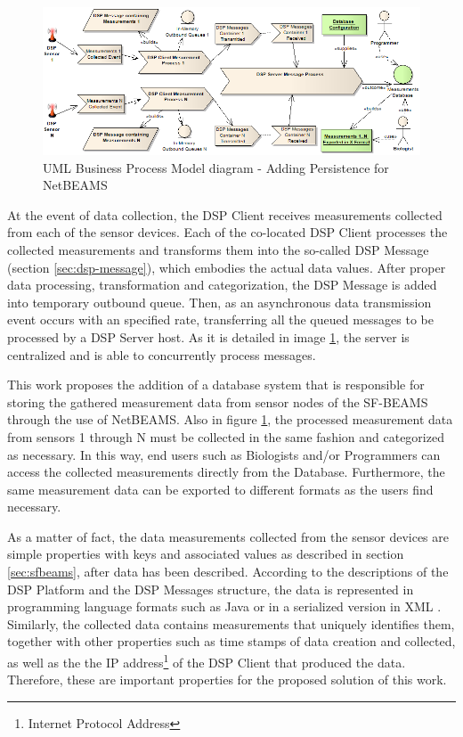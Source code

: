 \begin{figure}[!b]
  \centering
  \includegraphics[scale=0.5]{../diagrams/DSP-DataPersistence-Business-Diagram}
  \caption{UML Business Process Model diagram - Adding Persistence for NetBEAMS}
  \label{fig:dsp-persistence-business-process}
\end{figure}

At the event of data collection, the DSP Client receives measurements collected
from each of the sensor devices. Each of the co-located DSP Client processes
the collected measurements and transforms them into the so-called DSP Message
(section \ref{sec:dsp-message}), which embodies the actual data values. After
proper data processing, transformation and categorization, the DSP Message is
added into temporary outbound queue. Then, as an asynchronous data
transmission event occurs with an specified rate, transferring all the queued
messages to be processed by a DSP Server host. As it is detailed in image
\ref{fig:dsp-persistence-business-process}, the server is centralized and is
able to concurrently process messages.

This work proposes the addition of a database system that is responsible for
storing the gathered measurement data from sensor nodes of the SF-BEAMS through
the use of NetBEAMS. Also in figure \ref{fig:dsp-persistence-business-process}, 
the processed measurement data from sensors 1 through N must be collected in
the same fashion and categorized as necessary. In this way, end users such as
Biologists and/or Programmers can access the collected measurements directly
from the Database. Furthermore, the same measurement data can be exported to
different formats as the users find necessary.

As a matter of fact, the data measurements collected from the sensor devices
are simple properties with keys and associated values as described in section
\ref{sec:sfbeams}, after data has been described. According to the descriptions
of the DSP Platform and the DSP Messages structure, the data is represented in
programming language formats such as Java \cite{java} or in a serialized
version in XML \cite{xml}. Similarly, the collected data contains measurements
that uniquely identifies them, together with other properties such as time
stamps of data creation and collected, as well as the the IP
address\footnote{Internet Protocol Address} of the DSP Client that produced
the data. Therefore, these are important properties for the proposed solution
of this work.

